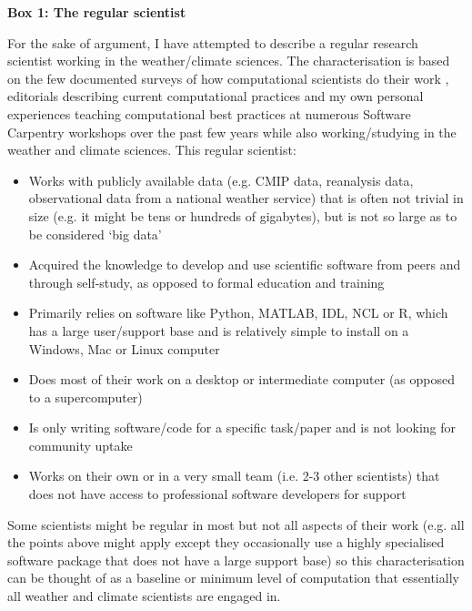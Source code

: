 \textbf{Box 1: The regular scientist}

For the sake of argument, I have attempted to describe a regular research scientist working in the weather/climate sciences. The characterisation is based on the few documented surveys of how computational scientists do their work \citep{Hannay2009,Stodden2010}, editorials describing current computational practices \citep[e.g.][]{Easterbrook2014} and my own personal experiences teaching computational best practices at numerous Software Carpentry \citep{Wilson2014} workshops over the past few years while also working/studying in the weather and climate sciences. This regular scientist:
\begin{itemize}
\item Works with publicly available data (e.g. CMIP data, reanalysis data, observational data from a national weather service) that is often not trivial in size (e.g. it might be tens or hundreds of gigabytes), but is not so large as to be considered `big data' 
\item Acquired the knowledge to develop and use scientific software from peers and through self-study, as opposed to formal education and training
\item Primarily relies on software like Python, MATLAB, IDL, NCL or R, which has a large user/support base and is relatively simple to install on a Windows, Mac or Linux computer
\item Does most of their work on a desktop or intermediate computer (as opposed to a supercomputer)
\item Is only writing software/code for a specific task/paper and is not looking for community uptake  
\item Works on their own or in a very small team (i.e. 2-3 other scientists) that does not have access to professional software developers for support
\end{itemize}

Some scientists might be regular in most but not all aspects of their work (e.g. all the points above might apply except they occasionally use a highly specialised software package that does not have a large support base) so this characterisation can be thought of as a baseline or minimum level of computation that essentially all weather and climate scientists are engaged in.  
